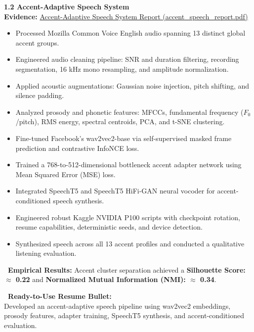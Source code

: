 \documentclass[10pt,a4paper]{article}
\newcommand{\statuscompleted}{\tcbox[on line, colback=completedbg, colframe=completed!50!white, size=small, arc=2pt, boxrule=0.5pt]{\scriptsize\bfseries\color{completed}\faIcon{check-circle}\ COMPLETED / SUBSTANTIAL}}
\begin{document}
\begin{projectcard}
  \textbf{\large 1.2 Accent-Adaptive Speech System} \hfill \statuscompleted\\[2pt]
  {\footnotesize\color{textmuted}\textbf{Evidence:} \underline{Accent-Adaptive Speech System Report (accent\_speech\_report.pdf)}}
  \begin{itemize}[leftmargin=14pt, itemsep=1.5pt, topsep=2pt]
    \item Processed Mozilla Common Voice English audio spanning 13 distinct global accent groups.
    \item Engineered audio cleaning pipeline: SNR and duration filtering, recording segmentation, 16 kHz mono resampling, and amplitude normalization.
    \item Applied acoustic augmentations: Gaussian noise injection, pitch shifting, and silence padding.
    \item Analyzed prosody and phonetic features: MFCCs, fundamental frequency ($F_0$/pitch), RMS energy, spectral centroids, PCA, and t-SNE clustering.
    \item Fine-tuned Facebook's wav2vec2-base via self-supervised masked frame prediction and contrastive InfoNCE loss.
    \item Trained a 768-to-512-dimensional bottleneck accent adapter network using Mean Squared Error (MSE) loss.
    \item Integrated SpeechT5 and SpeechT5 HiFi-GAN neural vocoder for accent-conditioned speech synthesis.
    \item Engineered robust Kaggle NVIDIA P100 scripts with checkpoint rotation, resume capabilities, deterministic seeds, and device detection.
    \item Synthesized speech across all 13 accent profiles and conducted a qualitative listening evaluation.
  \end{itemize}
  \begin{metricsbox}
    \textbf{\ Empirical Results:} Accent cluster separation achieved a \textbf{Silhouette Score: $\approx$ 0.22} and \textbf{Normalized Mutual Information (NMI): $\approx$ 0.34}.
  \end{metricsbox}
  \begin{resumebox}
    \textbf{\color{accent}\ Ready-to-Use Resume Bullet:}\\
    Developed an accent-adaptive speech pipeline using wav2vec2 embeddings, prosody features, adapter training, SpeechT5 synthesis, and accent-conditioned evaluation.
  \end{resumebox}
\end{projectcard}
\end{document}
